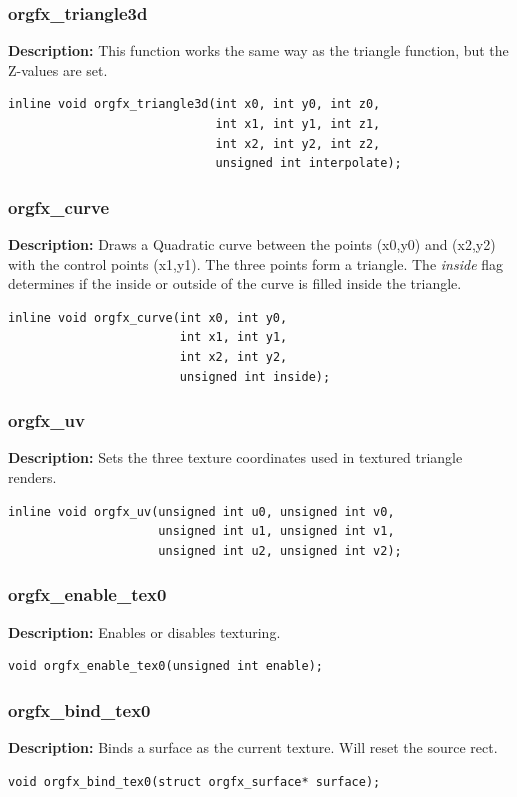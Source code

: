 \documentclass[10pt,a4paper]{article}
\begin{document}
\subsubsection{orgfx\_triangle3d}
\textbf{Description:} This function works the same way as the triangle function, but the Z-values are set.
\begin{lstlisting}
inline void orgfx_triangle3d(int x0, int y0, int z0, 
                             int x1, int y1, int z1, 
                             int x2, int y2, int z2, 
                             unsigned int interpolate);
\end{lstlisting}

\subsubsection{orgfx\_curve}
\textbf{Description:} Draws a Quadratic curve between the points (x0,y0) and (x2,y2) with the control points (x1,y1). The three points form a triangle. The \textit{inside} flag determines if the inside or outside of the curve is filled inside the triangle.
\begin{lstlisting}
inline void orgfx_curve(int x0, int y0, 
                        int x1, int y1, 
                        int x2, int y2, 
                        unsigned int inside);
\end{lstlisting}

\subsubsection{orgfx\_uv}
\textbf{Description:} Sets the three texture coordinates used in textured triangle renders.
\begin{lstlisting}
inline void orgfx_uv(unsigned int u0, unsigned int v0,
                     unsigned int u1, unsigned int v1,
                     unsigned int u2, unsigned int v2);
\end{lstlisting}

\subsubsection{orgfx\_enable\_tex0}
\textbf{Description:} Enables or disables texturing.
\begin{lstlisting}
void orgfx_enable_tex0(unsigned int enable);
\end{lstlisting}

\subsubsection{orgfx\_bind\_tex0}
\textbf{Description:} Binds a surface as the current texture. Will reset the source rect.
\begin{lstlisting}
void orgfx_bind_tex0(struct orgfx_surface* surface);
\end{lstlisting}
\end{document}
